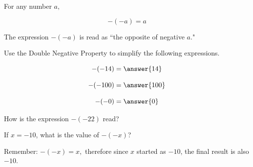 \documentclass{ximera}[font=12pt]
\begin{document}
\begin{definition}

For any number $a,$

\[ -(-a) = a \]

The expression $-(-a)$ is read as ``the opposite of negative $a$."

\end{definition}


\begin{problem}
Use the Double Negative Property to simplify the following expressions.

\[ -(-14) = \answer{14} \] 

\[ -(-100) = \answer{100}\] 

\[ -(-0) = \answer{0} \]

\end{problem}


\begin{problem}
How is the expression $-(-22)$ read?

\begin{multipleChoice}
\end{multipleChoice}

\end{problem}


\begin{problem}
If $x = -10$, what is the value of $-(-x)$?

\begin{multipleChoice}
\end{multipleChoice}

\begin{feedback}
Remember: $-(-x) = x,$ therefore since $x$ started as $-10$, the final result is also $-10$.
\end{feedback}
\end{problem}
\end{document}
